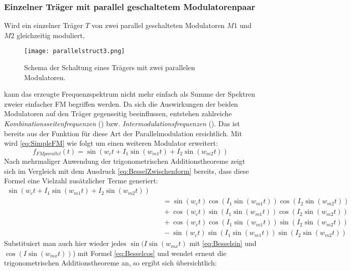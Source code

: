 \subsubsection{Einzelner Träger mit parallel geschaltetem Modulatorenpaar}
\label{singlecarryparallelmod}
Wird ein einzelner Träger $T$ von zwei parallel geschalteten Modulatoren $M1$ und $M2$ gleichzeitig moduliert, 
\FloatBarrier
\begin{figure} [ht]
\centering
  \texttt{[image: parallelstruct3.png]}
\caption{Schema der Schaltung eines Trägers mit zwei parallelen Modulatoren. }
\end{figure}
\FloatBarrier 
kann das erzeugte Frequenzspektrum nicht mehr einfach als Summe der Spektren zweier einfacher FM begriffen werden. Da sich die Auswirkungen der beiden Modulatoren auf den Träger gegenseitig beeinflussen, entstehen zahlreiche \textit{Kombinationsseitenfrequenzen} (\cite[S.117]{fmtheory}) bzw. \textit{Intermodulationsfrequenzen} (\cite{schottiWeb}). Das ist bereits aus der Funktion für diese Art der Parallelmodulation ersichtlich. Mit \cite[S.46]{schottstaedt} wird \ref{eq:SimpleFM} wie folgt um einen weiteren Modulator erweitert:
\begin{equation}
f_{FMparallel}(t) = \sin(w_ct + I_1\sin(w_{m1}t) + I_2\sin(w_{m2}t))
\end{equation}
Nach mehrmaliger Anwendung der trigonometrischen Additionstheoreme zeigt sich im Vergleich mit dem Ausdruck \ref{eq:BesselZwischenform} bereits, dass diese Formel eine Vielzahl zusätzlicher Terme generiert:
\begin{equation}
\begin{split}
\sin(w_ct + I_1\sin(w_{m1}t) + I_2\sin(w_{m2}t)) \\ &\quad = \sin(w_ct)\cos(I_1\sin(w_{m1}t))\cos(I_2\sin(w_{m2}t)) \\ &\quad + \cos(w_ct)\sin(I_1\sin(w_{m1}t))\cos(I_2\sin(w_{m2}t)) \\ &\quad +\cos(w_ct)\cos(I_1\sin(w_{m1}t))\sin(I_2\sin(w_{m2}t)) \\ &\quad -\sin(w_ct)\sin(I_1\sin(w_{m1}t))\sin(I_2\sin(w_{m2}t))
\end{split}
\end{equation}
Substituiert man auch hier wieder jedes \begin{math} \sin(I\sin(w_{mx}t) \end{math} mit \ref{eq:Besselsin} und \begin{math} \cos(I\sin(w_{mx}t)) \end{math}) mit Formel \ref{eq:Besselcos} und wendet erneut die trigonometrischen Additionstheoreme an, so ergibt sich übersichtlich:
